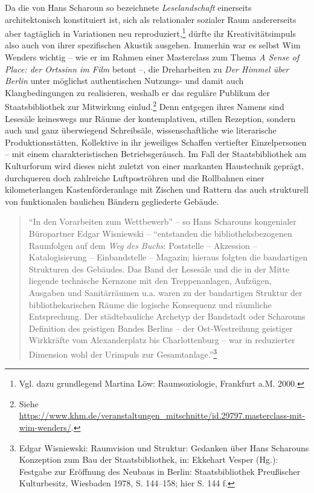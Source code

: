 \documentclass[a4paper,
fontsize=11pt,
oneside,
numbers=noperiodatend,
parskip=half-,
bibliography=totoc,
final
]{scrartcl}
\begin{document}
Da die von Hans Scharoun so bezeichnete \emph{Leselandschaft} einerseits
architektonisch konstituiert ist, sich als relationaler sozialer Raum
andererseits aber tagtäglich in Variationen neu reproduziert,\footnote{Vgl.
  dazu grundlegend Martina Löw: Raumsoziologie, Frankfurt a.M. 2000.}
dürfte ihr Kreativitätsimpuls also auch von ihrer spezifischen Akustik
ausgehen. Immerhin war es selbst Wim Wenders wichtig -- wie er im Rahmen
einer Masterclass zum Thema \emph{A Sense of Place: der Ortssinn im
Film} betont --, die Dreharbeiten zu \emph{Der Himmel über Berlin} unter
möglichst authentischen Nutzungs- und damit auch Klangbedingungen zu
realisieren, weshalb er das reguläre Publikum der Staatsbibliothek zur
Mitwirkung einlud.\footnote{Siehe
  \url{https://www.khm.de/veranstaltungen_mitschnitte/id.29797.masterclass-mit-wim-wenders/}.}
Denn entgegen ihres Namens sind Lesesäle keineswegs nur Räume der
kontemplativen, stillen Rezeption, sondern auch und ganz überwiegend
Schreibsäle, wissenschaftliche wie literarische Produktionsstätten,
Kollektive in ihr jeweiliges Schaffen vertiefter Einzelpersonen -- mit
einem charakteristischen Betriebsgeräusch. Im Fall der Staatsbibliothek
am Kulturforum wird dieses nicht zuletzt von einer markanten Haustechnik
geprägt, durchqueren doch zahlreiche Luftpoströhren und die Rollbahnen
einer kilometerlangen Kastenförderanlage mit Zischen und Rattern das
auch strukturell von funktionalen baulichen Bändern gegliederte Gebäude.

\begin{quote}
\enquote{In den Vorarbeiten zum Wettbewerb} -- so Hans Scharouns
kongenialer Büropartner Edgar Wisniewski -- \enquote{entstanden die
bibliotheksbezogenen Raumfolgen auf dem \emph{Weg des Buchs}: Poststelle
-- Akzession -- Katalogisierung -- Einbandstelle -- Magazin; hieraus
folgten die bandartigen Strukturen des Gebäudes. Das Band der Lesesäle
und die in der Mitte liegende technische Kernzone mit den
Treppenanlagen, Aufzügen, Ausgaben und Sanitärräumen u.a. waren zu der
bandartigen Struktur der bibliothekarischen Räume die logische
Konsequenz und räumliche Entsprechung. Der städtebauliche Archetyp der
Bandstadt oder Scharouns Definition des geistigen Bandes Berlins -- der
Ost-Westreihung geistiger Wirkkräfte vom Alexanderplatz bis
Charlottenburg -- war in reduzierter Dimension wohl der Urimpuls zur
Gesamtanlage.}\footnote{Edgar Wisniewski: Raumvision und Struktur:
  Gedanken über Hans Scharouns Konzeption zum Bau der Staatsbibliothek,
  in: Ekkehart Vesper (Hg.): Festgabe zur Eröffnung des Neubaus in
  Berlin: Staatsbibliothek Preußischer Kulturbesitz, Wiesbaden 1978, S.
  144--158; hier S. 144 f.}
\end{quote}
\end{document}
